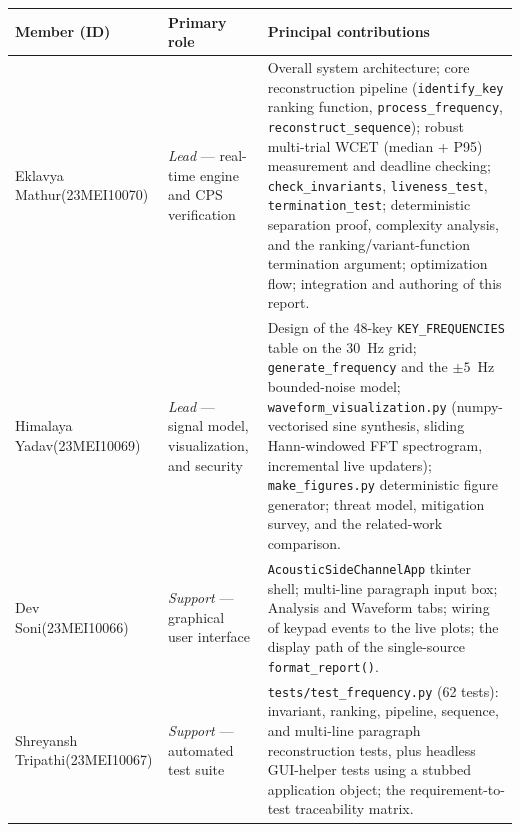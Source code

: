\documentclass[11pt,a4paper]{article}
\begin{document}
\begin{table}[H]
    \centering
    \begin{tabular}{@{}p{3.2cm}p{3.3cm}p{8.0cm}@{}}
        \toprule
        \textbf{Member (ID)} & \textbf{Primary role} &
        \textbf{Principal contributions} \\
        \midrule
        Eklavya Mathur\newline (23MEI10070) &
        \emph{Lead} --- real-time engine and CPS verification &
        Overall system architecture; core reconstruction pipeline
        (\texttt{identify\_key} ranking function, \texttt{process\_frequency},
        \texttt{reconstruct\_sequence}); robust multi-trial WCET
        (median + P95) measurement and deadline checking;
        \texttt{check\_invariants}, \texttt{liveness\_test},
        \texttt{termination\_test}; deterministic separation proof, complexity
        analysis, and the ranking/variant-function termination argument;
        optimization flow; integration and authoring of this report. \\
        \midrule
        Himalaya Yadav\newline (23MEI10069) &
        \emph{Lead} --- signal model, visualization, and security &
        Design of the 48-key \texttt{KEY\_FREQUENCIES} table on the 30~Hz grid;
        \texttt{generate\_frequency} and the $\pm 5$~Hz bounded-noise model;
        \texttt{waveform\_visualization.py} (numpy-vectorised sine synthesis,
        sliding Hann-windowed FFT spectrogram, incremental live updaters);
        \texttt{make\_figures.py} deterministic figure generator; threat model,
        mitigation survey, and the related-work comparison. \\
        \midrule
        Dev Soni\newline (23MEI10066) &
        \emph{Support} --- graphical user interface &
        \texttt{AcousticSideChannelApp} tkinter shell; multi-line paragraph
        input box; Analysis and Waveform tabs; wiring of keypad events to the
        live plots; the display path of the single-source
        \texttt{format\_report()}. \\
        \midrule
        Shreyansh Tripathi\newline (23MEI10067) &
        \emph{Support} --- automated test suite &
        \texttt{tests/test\_frequency.py} (62 tests): invariant, ranking,
        pipeline, sequence, and multi-line paragraph reconstruction tests, plus
        headless GUI-helper tests using a stubbed application object; the
        requirement-to-test traceability matrix. \\

\end{tabular}
\end{table}
\end{document}

